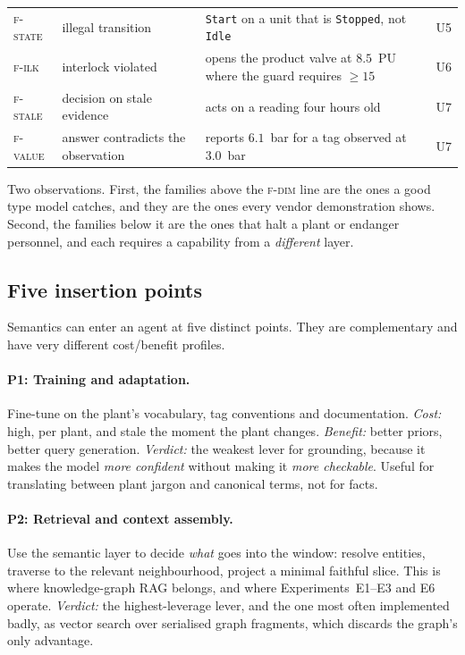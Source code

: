 \begin{table}[t]
\begin{tabular}{@{}L{1.9cm}L{2.6cm}L{7.3cm}L{1.1cm}@{}}
\textsc{f-state} & illegal transition &
\texttt{Start} on a unit that is \texttt{Stopped}, not \texttt{Idle} & U5 \\
\textsc{f-ilk} & interlock violated &
opens the product valve at $8.5$~PU where the guard requires $\geq 15$ & U6 \\
\textsc{f-stale} & decision on stale evidence &
acts on a reading four hours old & U7 \\
\textsc{f-value} & answer contradicts the observation &
reports $6.1$~bar for a tag observed at $3.0$~bar & U7 \\
\bottomrule
\end{tabular}
\end{table}

Two observations. First, the families above the \textsc{f-dim} line are the ones
a good type model catches, and they are the ones every vendor demonstration
shows. Second, the families below it are the ones that halt a plant or endanger
personnel, and each requires a capability from a \emph{different} layer.

\subsection{Five insertion points}

Semantics can enter an agent at five distinct points. They are complementary and
have very different cost/benefit profiles.

\paragraph{P1: Training and adaptation.} Fine-tune on the plant's vocabulary,
tag conventions and documentation. \emph{Cost:} high, per plant, and stale the
moment the plant changes. \emph{Benefit:} better priors, better query generation.
\emph{Verdict:} the weakest lever for grounding, because it makes the model
\emph{more confident} without making it \emph{more checkable}. Useful for
translating between plant jargon and canonical terms, not for facts.

\paragraph{P2: Retrieval and context assembly.} Use the semantic layer to
decide \emph{what} goes into the window: resolve entities, traverse to the
relevant neighbourhood, project a minimal faithful slice. This is where
knowledge-graph RAG belongs, and where Experiments~E1--E3 and E6 operate.
\emph{Verdict:} the highest-leverage lever, and the one most often implemented
badly, as vector search over serialised graph fragments, which discards the
graph's only advantage.


